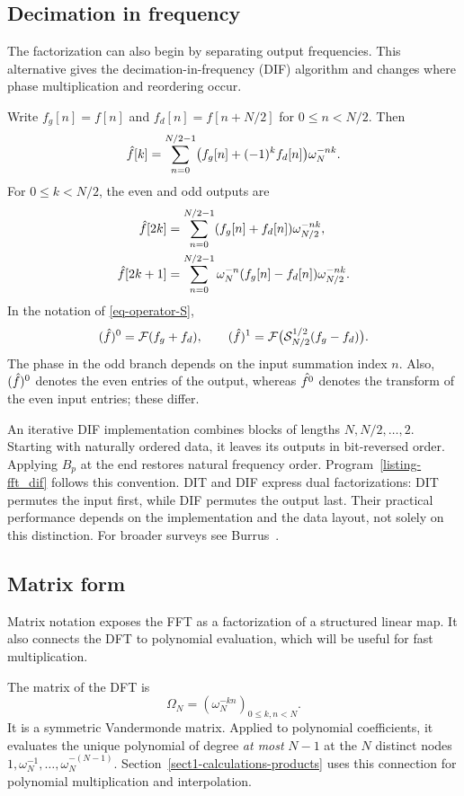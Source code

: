 \subsection{Decimation in frequency}
\label{sect2-frequency-decimation}

The factorization can also begin by separating output frequencies. This
alternative gives the decimation-in-frequency (DIF) algorithm and changes
where phase multiplication and reordering occur.

Write $f_g[n]=f[n]$ and
$f_d[n]=f[n+N/2]$ for $0\leq n<N/2$. Then
\[
 \hat{f}[k]=\sum_{n=0}^{N/2-1}\bigl(f_g[n]+(-1)^kf_d[n]\bigr)\omega_N^{-nk}.
\]
For $0\leq k<N/2$, the even and odd outputs are
\begin{align*}
 \hat{f}[2k]&=\sum_{n=0}^{N/2-1}(f_g[n]+f_d[n])\omega_{N/2}^{-nk},\\
 \hat{f}[2k+1]&=\sum_{n=0}^{N/2-1}\omega_N^{-n}
                          (f_g[n]-f_d[n])\omega_{N/2}^{-nk}.
\end{align*}
In the notation of \eqref{eq-operator-S},
\[
 (\hat{f})^0=\mathcal{F}(f_g+f_d),\qquad
 (\hat{f})^1=\mathcal{F}\bigl(\mathcal{S}_{N/2}^{1/2}(f_g-f_d)\bigr).
\]
The phase in the odd branch depends on the input summation index $n$.
Also, $(\hat{f})^0$ denotes the even entries of the output, whereas
$\hat{f^0}$ denotes the transform of the even input entries; these differ.

An iterative DIF implementation combines blocks of lengths $N,N/2,\ldots,2$.
Starting with naturally ordered data, it leaves its outputs in bit-reversed
order. Applying $B_p$ at the end restores natural frequency order.
Program~\ref{listing-fft_dif} follows this convention.
DIT and DIF express dual factorizations: DIT permutes the input first, while
DIF permutes the output last. Their practical performance depends on the
implementation and the data layout, not solely on this distinction.
For broader surveys see Burrus~\cite{burrus-fft}.

\subsection{Matrix form}
\label{sect1-matrix-writing}

Matrix notation exposes the FFT as a factorization of a structured linear
map. It also connects the DFT to polynomial evaluation, which will be useful
for fast multiplication.

The matrix of the DFT is
\begin{equation}
\label{eq-defn-matrix-fourier}
 \Omega_N=(\omega_N^{-kn})_{0\leq k,n<N}.
\end{equation}
It is a symmetric Vandermonde matrix. Applied to polynomial coefficients,
it evaluates the unique polynomial of degree \emph{at most} $N-1$ at the
$N$ distinct nodes $1,\omega_N^{-1},\ldots,\omega_N^{-(N-1)}$.
Section~\ref{sect1-calculations-products} uses this connection for polynomial
multiplication and interpolation.

